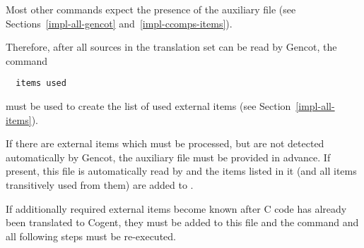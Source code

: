 Most other commands expect the presence of the auxiliary file 
(see Sections~\ref{impl-all-gencot} and~\ref{impl-ccomps-items}).

Therefore, after all sources in the translation set can be read by Gencot, the command
\begin{verbatim}
  items used
\end{verbatim}
must be used to create the list of used external items (see Section~\ref{impl-all-items}).

If there are external items which must be processed, but are not detected automatically by Gencot,
the auxiliary file  must be provided in advance. If present, this file is 
automatically read by  and the items listed in it (and all items transitively used 
from them) are added to .

If additionally required
external items become known after C code has already been translated to Cogent, they must be 
added to this file and the command  and all following steps must be re-executed.

